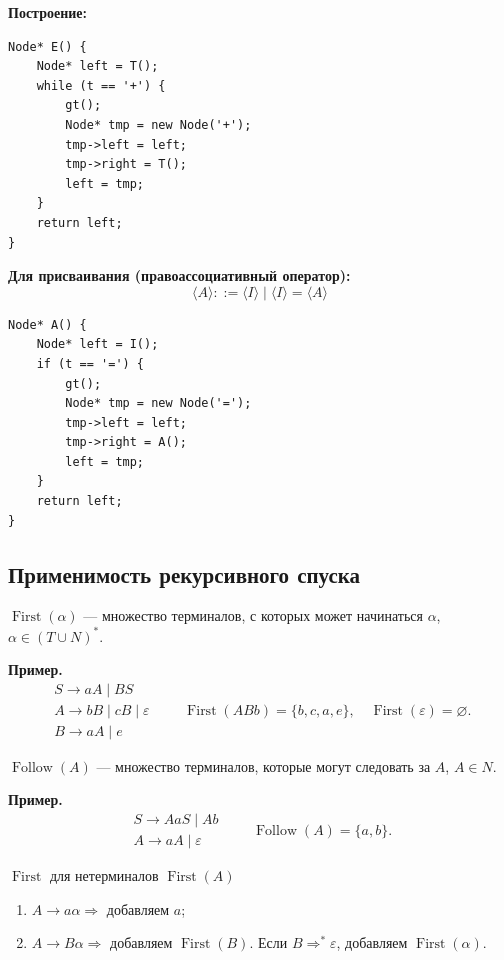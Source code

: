 \documentclass[11pt,a4paper]{article}
\newcommand{\rul}{\rightarrow}
\begin{document}
\textbf{Построение:}
\begin{lstlisting}
Node* E() {
    Node* left = T();
    while (t == '+') {
        gt();
        Node* tmp = new Node('+');
        tmp->left = left;
        tmp->right = T();
        left = tmp;
    }
    return left;
}
\end{lstlisting}

\textbf{Для присваивания (правоассоциативный оператор):}
\[
\langle A\rangle::=\langle I\rangle\mid\langle I\rangle=\langle A\rangle
\]
\begin{lstlisting}
Node* A() {
    Node* left = I();
    if (t == '=') {
        gt();
        Node* tmp = new Node('=');
        tmp->left = left;
        tmp->right = A();
        left = tmp;
    }
    return left;
}
\end{lstlisting}

\subsection{Применимость рекурсивного спуска}

\begin{opr}
$\operatorname{First}(\alpha)$ — множество терминалов, с которых может начинаться $\alpha$, $\alpha\in(T\cup N)^*$.
\end{opr}

\textbf{Пример.}
\[
\begin{array}{l}
S\rul aA\mid BS\\ A\rul bB\mid cB\mid\varepsilon\\ B\rul aA\mid e
\end{array}
\qquad
\operatorname{First}(ABb)=\{b,c,a,e\},\quad\operatorname{First}(\varepsilon)=\varnothing.
\]

\begin{opr}
$\operatorname{Follow}(A)$ — множество терминалов, которые могут следовать за $A$, $A\in N$.
\end{opr}

\textbf{Пример.}
\[
\begin{array}{l}
S\rul AaS\mid Ab\\ A\rul aA\mid\varepsilon
\end{array}
\qquad
\operatorname{Follow}(A)=\{a,b\}.
\]

\begin{kvb}{$\operatorname{First}$ для нетерминалов $\operatorname{First}(A)$}
\begin{enumerate}
\item $A\rul a\alpha\Rightarrow$ добавляем $a$;
\item $A\rul B\alpha\Rightarrow$ добавляем $\operatorname{First}(B)$. Если $B\Rightarrow^*\varepsilon$, добавляем $\operatorname{First}(\alpha)$.
\end{enumerate}
\end{kvb}
\end{document}

